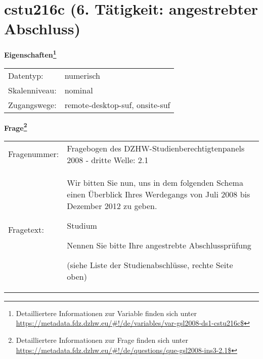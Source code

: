 
    \setcounter{footnote}{0}

    \vspace*{-1.8cm}
	\section{cstu216c (6. Tätigkeit: angestrebter Abschluss)}
	\label{section:cstu216c}



    \vspace*{0.5cm}
    \noindent\textbf{Eigenschaften\footnote{Detailliertere Informationen zur Variable finden sich unter
		\url{https://metadata.fdz.dzhw.eu/\#!/de/variables/var-gsl2008-ds1-cstu216c$}}}\\
	\begin{tabularx}{\hsize}{@{}lX}
	Datentyp: & numerisch \\
	Skalenniveau: & nominal \\
	Zugangswege: &
	  remote-desktop-suf, 
	  onsite-suf
 \\
    \end{tabularx}



				\vspace*{0.5cm}
                \noindent\textbf{Frage\footnote{Detailliertere Informationen zur Frage finden sich unter
		              \url{https://metadata.fdz.dzhw.eu/\#!/de/questions/que-gsl2008-ins3-2.1$}}}\\
				\begin{tabularx}{\hsize}{@{}lX}
					Fragenummer: &
					  Fragebogen des DZHW-Studienberechtigtenpanels 2008 - dritte Welle:
					  2.1
 \\
					Fragetext: & Wir bitten Sie nun, uns in dem folgenden Schema einen Überblick Ihres Werdegangs von Juli 2008 bis Dezember 2012 zu geben.\par  Studium\par  Nennen Sie bitte Ihre angestrebte Abschlussprüfung \par  (siehe Liste der Studienabschlüsse, rechte Seite oben) \\
				\end{tabularx}





